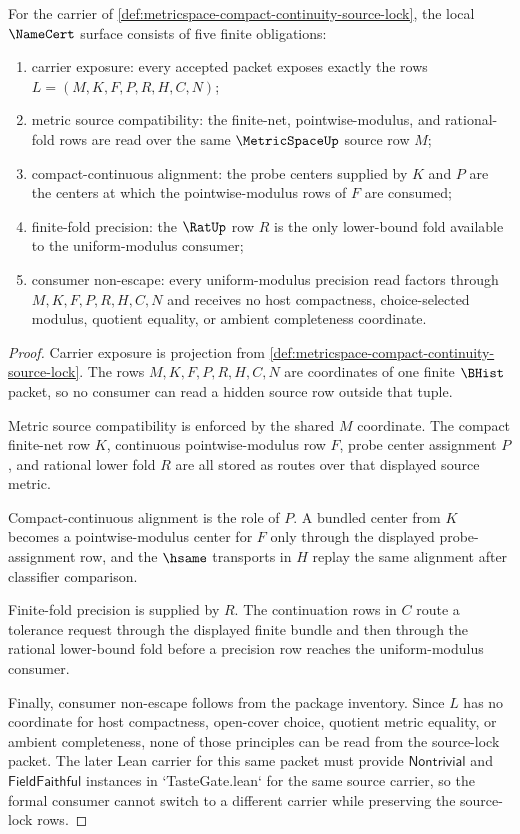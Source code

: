\begin{theorem}
\label{thm:metricspace-compact-continuity-source-lock-obligations}
For the carrier of \autoref{def:metricspace-compact-continuity-source-lock}, the local $\NameCert$ surface consists of five finite obligations:
\begin{enumerate}
\item carrier exposure: every accepted packet exposes exactly the rows $L=(M,K,F,P,R,H,C,N)$;
\item metric source compatibility: the finite-net, pointwise-modulus, and rational-fold rows are read over the same $\MetricSpaceUp$ source row $M$;
\item compact-continuous alignment: the probe centers supplied by $K$ and $P$ are the centers at which the pointwise-modulus rows of $F$ are consumed;
\item finite-fold precision: the $\RatUp$ row $R$ is the only lower-bound fold available to the uniform-modulus consumer;
\item consumer non-escape: every uniform-modulus precision read factors through $M,K,F,P,R,H,C,N$ and receives no host compactness, choice-selected modulus, quotient equality, or ambient completeness coordinate.
\end{enumerate}
\end{theorem}
\begin{proof}
Carrier exposure is projection from \autoref{def:metricspace-compact-continuity-source-lock}. The rows $M,K,F,P,R,H,C,N$ are coordinates of one finite $\BHist$ packet, so no consumer can read a hidden source row outside that tuple.

Metric source compatibility is enforced by the shared $M$ coordinate. The compact finite-net row $K$, continuous pointwise-modulus row $F$, probe center assignment $P$, and rational lower fold $R$ are all stored as routes over that displayed source metric.

Compact-continuous alignment is the role of $P$. A bundled center from $K$ becomes a pointwise-modulus center for $F$ only through the displayed probe-assignment row, and the $\hsame$ transports in $H$ replay the same alignment after classifier comparison.

Finite-fold precision is supplied by $R$. The continuation rows in $C$ route a tolerance request through the displayed finite bundle and then through the rational lower-bound fold before a precision row reaches the uniform-modulus consumer.

Finally, consumer non-escape follows from the package inventory. Since $L$ has no coordinate for host compactness, open-cover choice, quotient metric equality, or ambient completeness, none of those principles can be read from the source-lock packet. The later Lean carrier for this same packet must provide $\mathsf{Nontrivial}$ and $\mathsf{FieldFaithful}$ instances in `TasteGate.lean` for the same source carrier, so the formal consumer cannot switch to a different carrier while preserving the source-lock rows.
\end{proof}

